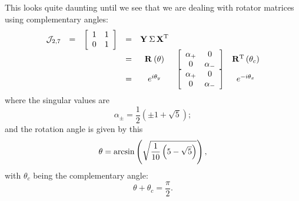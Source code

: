 This looks quite daunting until we see that we are dealing with rotator matrices using complementary angles:
\begin{equation}
  \begin{array}{ccccccc}
    \mathcal{J}_{2,7} &=& 
\mat{cc}
{
 1 & 1 \\
 0 & 1
}
 &=& \svd{T}\\
 &&&=& \rat{\theta}{}
&\mat{cc}{
 \alpha_{+} & 0 \\
 0 & \alpha_{-}
}
&\rat{\theta_{c}}{T}\\
 &&&=& e^{i\theta_{y}}
&\mat{cc}{
 \alpha_{+} & 0 \\
 0 & \alpha_{-}
}
&e^{-i\theta_{x}}
  \end{array}
\end{equation}
where the singular values are
\begin{equation}
  \alpha_{\pm} = \frac{1}{2} \left(\pm1+\sqrt{5}\right);
  \label{eq:j27:1}
\end{equation}
and the rotation angle is given by this
\begin{equation}
  \theta = \arcsin\paren{\sqrt{\frac{1}{10} \left(5-\sqrt{5}\right)}},
  \label{eq:j27:2}
\end{equation}
with $\theta_{c}$ being the complementary angle:
\begin{equation}
  \theta + \theta_{c} = \frac{\pi}{2}.
  \label{eq:j27:3}
\end{equation}


\endinput